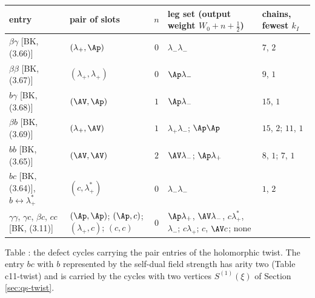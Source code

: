 \begin{longtable}{p{3.2cm}|p{3.4cm}|c|p{4.6cm}|p{2.0cm}}
entry & pair of slots & $n$ & leg set (output weight $W_0+n+\tfrac12$) & chains, fewest $k_I$\\
\hline
$\beta\gamma$ [BK, (3.66)] & $(\lambda_+,\Ap)$ & $0$ & $\lambda_-\lambda_-$ & $7$, $2$\\
$\beta\beta$ [BK, (3.67)] & $(\lambda_+,\lambda_+)$ & $0$ & $\Ap\lambda_-$ & $9$, $1$\\
$b\gamma$ [BK, (3.68)] & $(\AV,\Ap)$ & $1$ & $\Ap\lambda_-$ & $15$, $1$\\
$\beta b$ [BK, (3.69)] & $(\lambda_+,\AV)$ & $1$ & $\lambda_+\lambda_-$; $\Ap\Ap$ & $15$, $2$; $11$, $1$\\
$bb$ [BK, (3.65)] & $(\AV,\AV)$ & $2$ & $\AV\lambda_-$; $\Ap\lambda_+$ & $8$, $1$; $7$, $1$\\
$bc$ [BK, (3.64)], $b\leftrightarrow\lambda^*_+$ & $(c,\lambda^*_+)$ & $0$ & $\lambda_-\lambda_-$ & $1$, $2$\\
$\gamma\gamma$, $\gamma c$, $\beta c$, $cc$ [BK, (3.11)] & $(\Ap,\Ap)$; $(\Ap,c)$; $(\lambda_+,c)$; $(c,c)$ & $0$ & $\Ap\lambda_+$, $\AV\lambda_-$, $c\lambda^*_+$, $\lambda_-$; $c\lambda_+$; $c$, $\AV c$; none & \\
\end{longtable}
\begin{center}Table \thetable\label{tab:qs-twistcensus}: the defect cycles carrying the pair entries of the holomorphic twist. The entry $bc$ with $b$ represented by the self-dual field strength has arity two (Table c11-twist) and is carried by the cycles with two vertices $S^{(1)}(\xi)$ of Section \ref{sec:qs-twist}.\end{center}
